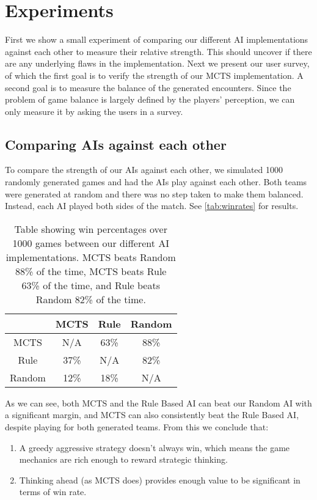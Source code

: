 \chapter{Experiments}
\label{chapter05}

First we show a small experiment of comparing our different AI implementations against each other to measure their relative strength. This should uncover if there are any underlying flaws in the implementation. Next we present our user survey, of which the first goal is to verify the strength of our MCTS implementation. A second goal is to measure the balance of the generated encounters. Since the problem of game balance is largely defined by the players' perception, we can only measure it by asking the users in a survey.

\section{Comparing AIs against each other}

To compare the strength of our AIs against each other, we simulated 1000 randomly generated games
and had the AIs play against each other. Both teams were generated at random and there was no step taken
to make them balanced. Instead, each AI played both sides of the match. See \autoref{tab:winrates} for results.

\begin{table}[h]
	\centering
	\begin{tabular}{|| c | c c c ||}
		\hline
		& MCTS & Rule & Random \\
		\hline\hline
		MCTS & N/A & 63\% & 88\% \\
		Rule & 37\%& N/A & 82\% \\
		Random & 12\% & 18\% & N/A \\
		\hline
	\end{tabular}
	\caption{Table showing win percentages over 1000 games between our different AI implementations.
	MCTS beats Random 88\% of the time, MCTS beats Rule 63\% of the time, and Rule beats Random 82\% of the time.}
	\label{tab:winrates}
\end{table}

As we can see, both MCTS and the Rule Based AI can beat our Random AI with a significant margin,
and MCTS can also consistently beat the Rule Based AI, despite playing for both generated teams.
From this we conclude that:

\begin{enumerate}
	\item A greedy aggressive strategy doesn't always win, which means the game mechanics are rich enough
	to reward strategic thinking.
	\item Thinking ahead (as MCTS does) provides enough value to be significant in terms of win rate.
\end{enumerate}

